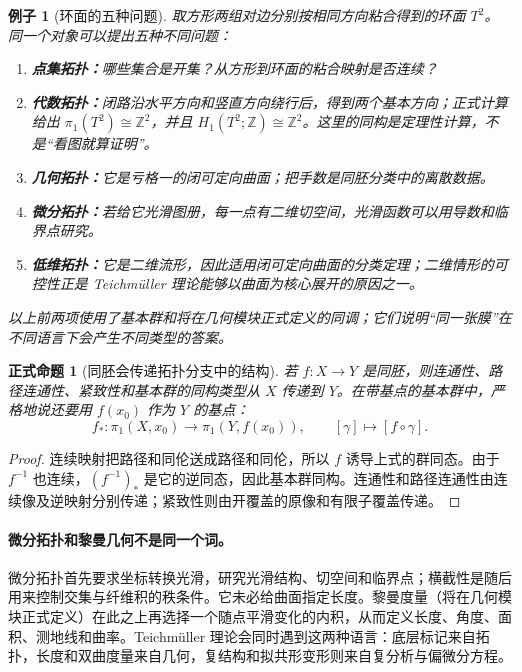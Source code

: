 \documentclass[UTF8,fontset=none,a4paper,11pt]{ctexart}
\theoremstyle{foundation-definition}
\theoremstyle{foundation-theorem}
\theoremstyle{foundation-proposition}
\newtheorem{proposition}[definition]{正式命题}
\theoremstyle{foundation-example}
\newtheorem{example}[definition]{例子}
\theoremstyle{foundation-remark}
\theoremstyle{foundation-theorem}
\begin{document}
\begin{example}[环面的五种问题]
取方形两组对边分别按相同方向粘合得到的环面 \(T^2\)。同一个对象可以提出五种不同问题：
\begin{enumerate}[label=(\arabic*)]
  \item \textbf{点集拓扑：}哪些集合是开集？从方形到环面的粘合映射是否连续？
  \item \textbf{代数拓扑：}闭路沿水平方向和竖直方向绕行后，得到两个基本方向；正式计算给出 \(\pi_1(T^2)\cong\mathbb Z^2\)，并且 \(H_1(T^2;\mathbb Z)\cong\mathbb Z^2\)。这里的同构是定理性计算，不是“看图就算证明”。
  \item \textbf{几何拓扑：}它是亏格一的闭可定向曲面；把手数是同胚分类中的离散数据。
  \item \textbf{微分拓扑：}若给它光滑图册，每一点有二维切空间，光滑函数可以用导数和临界点研究。
  \item \textbf{低维拓扑：}它是二维流形，因此适用闭可定向曲面的分类定理；二维情形的可控性正是 Teichmüller 理论能够以曲面为核心展开的原因之一。
\end{enumerate}
以上前两项使用了基本群和将在几何模块正式定义的同调；它们说明“同一张膜”在不同语言下会产生不同类型的答案。
\end{example}

\begin{proposition}[同胚会传递拓扑分支中的结构]
若 \(f:X\to Y\) 是同胚，则连通性、路径连通性、紧致性和基本群的同构类型从 \(X\) 传递到 \(Y\)。在带基点的基本群中，严格地说还要用 \(f(x_0)\) 作为 \(Y\) 的基点：
\[
f_*:\pi_1(X,x_0)\longrightarrow \pi_1(Y,f(x_0)),
\qquad [\gamma]\longmapsto[f\circ\gamma].
\]
\end{proposition}

\begin{proof}
连续映射把路径和同伦送成路径和同伦，所以 \(f\) 诱导上式的群同态。由于 \(f^{-1}\) 也连续，\((f^{-1})_*\) 是它的逆同态，因此基本群同构。连通性和路径连通性由连续像及逆映射分别传递；紧致性则由开覆盖的原像和有限子覆盖传递。
\end{proof}

\paragraph{微分拓扑和黎曼几何不是同一个词。}
微分拓扑首先要求坐标转换光滑，研究光滑结构、切空间和临界点；横截性是随后用来控制交集与纤维积的秩条件。它未必给曲面指定长度。黎曼度量（将在几何模块正式定义）在此之上再选择一个随点平滑变化的内积，从而定义长度、角度、面积、测地线和曲率。Teichmüller 理论会同时遇到这两种语言：底层标记来自拓扑，长度和双曲度量来自几何，复结构和拟共形变形则来自复分析与偏微分方程。
\end{document}

